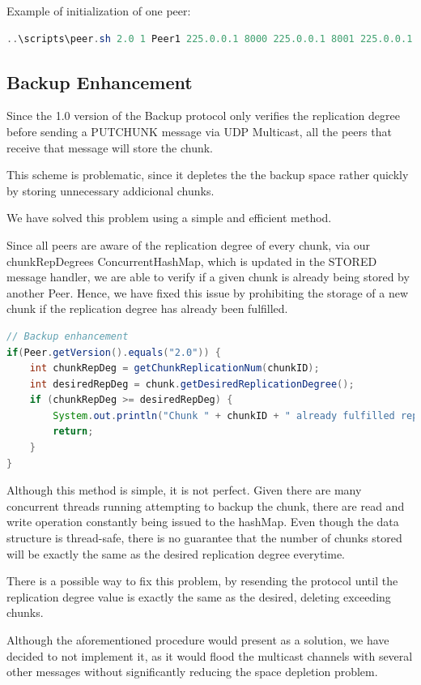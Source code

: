 \documentclass[11pt]{article}
\begin{document}
Example of initialization of one peer:
\begin{lstlisting}[language=java]
..\scripts\peer.sh 2.0 1 Peer1 225.0.0.1 8000 225.0.0.1 8001 225.0.0.1 8002
\end{lstlisting}

\pagebreak
\subsection{Backup Enhancement}
Since the 1.0 version of the Backup protocol only verifies the replication degree before sending a PUTCHUNK message via UDP Multicast, all the peers that receive that message will store the chunk.

This scheme is problematic, since it depletes the the backup space rather quickly by storing unnecessary addicional chunks.

We have solved this problem using a simple and efficient method.

Since all peers are aware of the replication degree of every chunk, via our chunkRepDegrees ConcurrentHashMap, which is updated in the STORED message handler, we are able to verify if a given chunk is already being stored
by another Peer. Hence, we have fixed this issue by prohibiting the storage of a new chunk if the replication degree has already been fulfilled.

\begin{lstlisting}[language=java]
// Backup enhancement
if(Peer.getVersion().equals("2.0")) {
	int chunkRepDeg = getChunkReplicationNum(chunkID);
	int desiredRepDeg = chunk.getDesiredReplicationDegree();
	if (chunkRepDeg >= desiredRepDeg) {
		System.out.println("Chunk " + chunkID + " already fulfilled repDegree. Ignoring chunk...");
		return;
	}
}
\end{lstlisting}

Although this method is simple, it is not perfect.
Given there are many concurrent threads running attempting to backup the chunk, there are read and write operation constantly being issued to the hashMap.
Even though the data structure is thread-safe, there is no guarantee that the number of chunks stored will be exactly the same as the desired replication degree everytime.

There is a possible way to fix this problem, by resending the protocol until the replication degree value is exactly the same as the desired, deleting exceeding chunks.

Although the aforementioned procedure would present as a solution, we have decided to not implement it, 
as it would flood the multicast channels with several other messages without significantly reducing the space depletion problem.
\end{document}
